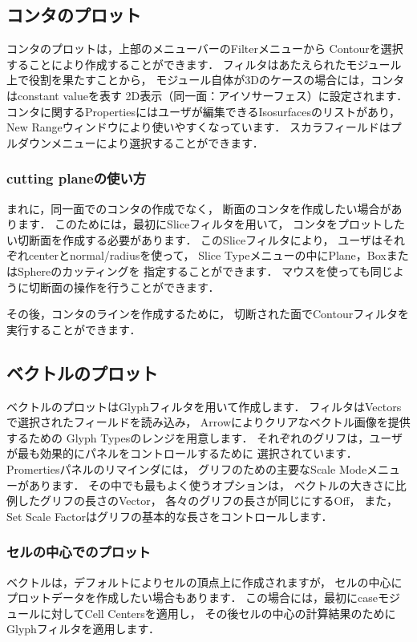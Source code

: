 \subsection{コンタのプロット}
\label{ssec:6.1.6}
コンタのプロットは，上部のメニューバーのFilterメニューから
Contourを選択することにより作成することができます．
フィルタはあたえられたモジュール上で役割を果たすことから，
モジュール自体が3Dのケースの場合には，コンタはconstant valueを表す
2D表示（同一面：アイソサーフェス）に設定されます．
コンタに関するPropertiesにはユーザが編集できるIsosurfacesのリストがあり，
New Rangeウィンドウにより使いやすくなっています．
スカラフィールドはプルダウンメニューにより選択することができます．

\subsubsection{cutting planeの使い方}
\label{sssec:6.1.6.1}
まれに，同一面でのコンタの作成でなく，
断面のコンタを作成したい場合があります．
このためには，最初にSliceフィルタを用いて，
コンタをプロットしたい切断面を作成する必要があります．
このSliceフィルタにより，
ユーザはそれぞれcenterとnormal/radiusを使って，
Slice Typeメニューの中にPlane，BoxまたはSphereのカッティングを
指定することができます．
マウスを使っても同じように切断面の操作を行うことができます．

その後，コンタのラインを作成するために，
切断された面でContourフィルタを実行することができます．


\subsection{ベクトルのプロット}
\label{ssec:6.1.7}
ベクトルのプロットはGlyphフィルタを用いて作成します．
フィルタはVectorsで選択されたフィールドを読み込み，
Arrowによりクリアなベクトル画像を提供するための
Glyph Typesのレンジを用意します．
それぞれのグリフは，ユーザが最も効果的にパネルをコントロールするために
選択されています． Promertiesパネルのリマインダには，
グリフのための主要なScale Modeメニューがあります．
その中でも最もよく使うオプションは，
ベクトルの大きさに比例したグリフの長さのVector，
各々のグリフの長さが同じにするOff，
また，Set Scale Factorはグリフの基本的な長さをコントロールします．

\subsubsection{セルの中心でのプロット}
\label{sssec:6.1.7.1}
ベクトルは，デフォルトによりセルの頂点上に作成されますが，
セルの中心にプロットデータを作成したい場合もあります．
この場合には，最初にcaseモジュールに対してCell Centersを適用し，
その後セルの中心の計算結果のためにGlyphフィルタを適用します．


